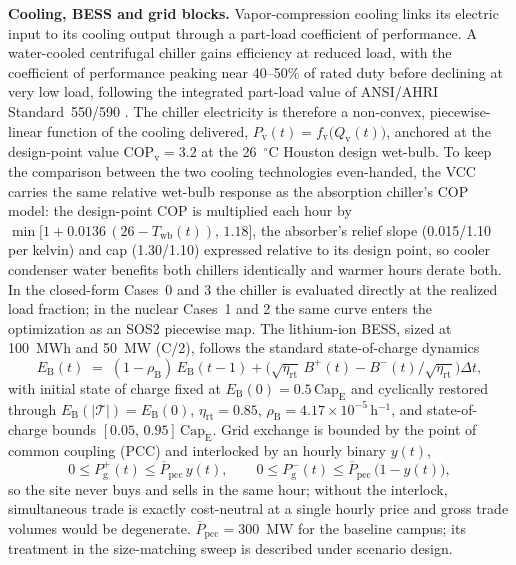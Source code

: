 \documentclass[sn-vancouver,Numbered]{sn-jnl}%
\newcommand{\runinhead}[1]{\par\smallskip\noindent\textbf{#1.}\quad}
\begin{document}
\runinhead{Cooling, BESS and grid blocks}
Vapor-compression cooling links its electric input to its cooling output through a part-load coefficient of performance. A water-cooled centrifugal chiller gains efficiency at reduced load, with the coefficient of performance peaking near 40--50\% of rated duty before declining at very low load, following the integrated part-load value of ANSI/AHRI Standard~550/590 \citep{ahri2020standard550}. The chiller electricity is therefore a non-convex, piecewise-linear function of the cooling delivered, $P_{\mathrm{v}}(t)=f_{\mathrm{v}}\!\big(Q_{\mathrm{v}}(t)\big)$, anchored at the design-point value $\mathrm{COP}_{\mathrm{v}}=3.2$ at the 26~$^\circ$C Houston design wet-bulb. To keep the comparison between the two cooling technologies even-handed, the VCC carries the same relative wet-bulb response as the absorption chiller's COP model: the design-point COP is multiplied each hour by $\min\!\big[1+0.0136\,(26-T_{\mathrm{wb}}(t)),\,1.18\big]$, the absorber's relief slope (0.015/1.10 per kelvin) and cap (1.30/1.10) expressed relative to its design point, so cooler condenser water benefits both chillers identically and warmer hours derate both. In the closed-form Cases~0 and 3 the chiller is evaluated directly at the realized load fraction; in the nuclear Cases~1 and 2 the same curve enters the optimization as an SOS2 piecewise map. The lithium-ion BESS, sized at 100~MWh and 50~MW (C/2), follows the standard state-of-charge dynamics
\begin{equation}
\label{eq:bess_soc}
E_{\mathrm{B}}(t) \;=\; (1-\rho_{\mathrm{B}})\,E_{\mathrm{B}}(t-1) + \big(\sqrt{\eta_{\mathrm{rt}}}\,B^{+}(t) - B^{-}(t)/\sqrt{\eta_{\mathrm{rt}}}\big)\Delta t,
\end{equation}
with initial state of charge fixed at $E_{\mathrm{B}}(0)=0.5\,\mathrm{Cap}_{\mathrm{E}}$ and cyclically restored through $E_{\mathrm{B}}(|\mathcal{T}|) = E_{\mathrm{B}}(0)$, $\eta_{\mathrm{rt}}=0.85$, $\rho_{\mathrm{B}}=4.17\times10^{-5}$\,h$^{-1}$, and state-of-charge bounds $[0.05,\, 0.95]\,\mathrm{Cap}_{\mathrm{E}}$. Grid exchange is bounded by the point of common coupling (PCC) and interlocked by an hourly binary $y(t)$,
\begin{equation}
\label{eq:grid_interlock}
0 \le P_{\mathrm{g}}^{+}(t) \le \overline{P}_{\mathrm{pcc}}\, y(t), \qquad
0 \le P_{\mathrm{g}}^{-}(t) \le \overline{P}_{\mathrm{pcc}}\, \big(1 - y(t)\big),
\end{equation}
so the site never buys and sells in the same hour; without the interlock, simultaneous trade is exactly cost-neutral at a single hourly price and gross trade volumes would be degenerate. $\overline{P}_{\mathrm{pcc}}=300$~MW for the baseline campus; its treatment in the size-matching sweep is described under scenario design.
\end{document}
